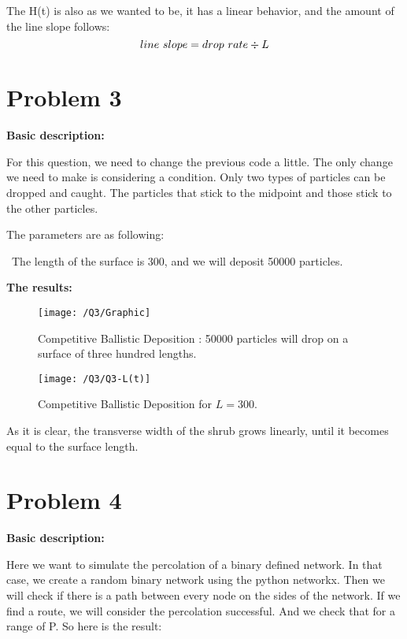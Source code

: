 \documentclass{article}
\begin{document}
    The H(t) is also as we wanted to be, it has a linear behavior,
    and the amount of the line slope follows:
    \begin{equation}
        \centering
        line \ slope = drop \ rate \div L
    \end{equation}

    \section*{Problem 3}
    \textbf{Basic description:}

    For this question, we need to change the previous code a little.
    The only change we need to make is considering a condition.
    Only two types of particles can be dropped and caught.
    The particles that stick to the midpoint and those stick to the other particles.

    The parameters are as following:

    \textbullet \ The length of the surface is 300, and we will deposit 50000 particles.

    \textbf{The results:}

    \begin{figure}[!htb]
        \centering
        \texttt{[image: /Q3/Graphic]}
        \label{fig:3.1}
        \caption{Competitive Ballistic Deposition :
        50000 particles will drop on a surface of three hundred lengths.}
    \end{figure}

    \begin{figure}[!htb]
        \centering
        \texttt{[image: /Q3/Q3-L(t)]}
        \label{fig:3.2}
        \caption{Competitive Ballistic Deposition for $L=300$.}
    \end{figure}

    As it is clear, the transverse width of the shrub grows linearly,
    until it becomes equal to the surface length.

    \section*{Problem 4}
    \textbf{Basic description:}

    Here we want to simulate the percolation of a binary defined network.
    In that case, we create a random binary network using the python networkx.
    Then we will check if there is a path between every node on the sides of the network.
    If we find a route, we will consider the percolation successful. And we check that for a range of P.
    So here is the result:
\end{document}

